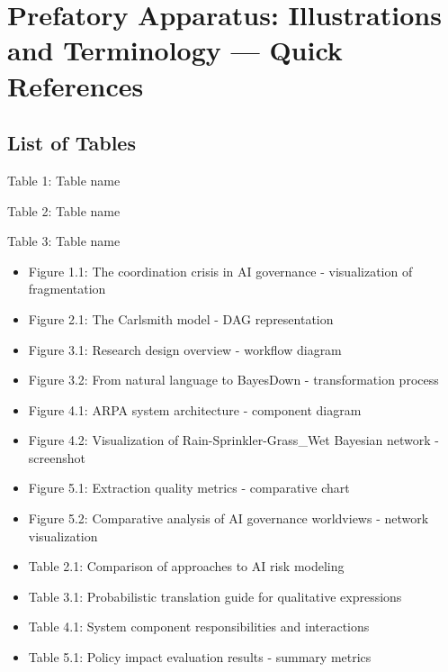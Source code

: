 \documentclass[]{book}
\providecommand{\tightlist}{%
  \setlength{\itemsep}{0pt}\setlength{\parskip}{0pt}}
\begin{document}

\chapter*{Prefatory Apparatus: Illustrations and Terminology --- Quick
References}\label{prefatory-apparatus-illustrations-and-terminology-quick-references}


\section*{List of Tables}\label{list-of-tables}


Table 1: Table name

Table 2: Table name

Table 3: Table name

\begin{itemize}
\tightlist
\item
  Figure 1.1: The coordination crisis in AI governance - visualization
  of fragmentation\\
\item
  Figure 2.1: The Carlsmith model - DAG representation\\
\item
  Figure 3.1: Research design overview - workflow diagram\\
\item
  Figure 3.2: From natural language to BayesDown - transformation
  process\\
\item
  Figure 4.1: ARPA system architecture - component diagram\\
\item
  Figure 4.2: Visualization of Rain-Sprinkler-Grass\_Wet Bayesian
  network - screenshot\\
\item
  Figure 5.1: Extraction quality metrics - comparative chart\\
\item
  Figure 5.2: Comparative analysis of AI governance worldviews - network
  visualization\\
\item
  Table 2.1: Comparison of approaches to AI risk modeling\\
\item
  Table 3.1: Probabilistic translation guide for qualitative
  expressions\\
\item
  Table 4.1: System component responsibilities and interactions\\
\item
  Table 5.1: Policy impact evaluation results - summary metrics
\end{itemize}
\end{document}
